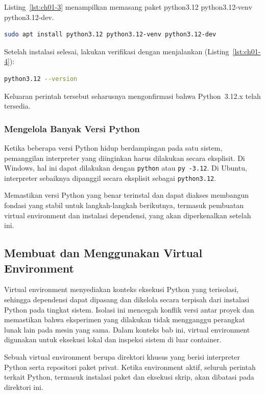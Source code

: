 Listing~\ref{lst:ch01-3} menampilkan memasang paket python3.12 python3.12-venv python3.12-dev.
\begin{lstlisting}[language=bash, caption={Memasang paket python3.12 python3.12-venv python3.12-dev}, label={lst:ch01-3}]
sudo apt install python3.12 python3.12-venv python3.12-dev
\end{lstlisting}

Setelah instalasi selesai, lakukan verifikasi dengan menjalankan (Listing~\ref{lst:ch01-4}):

\begin{lstlisting}[language=bash, caption={Memeriksa versi Python (2)}, label={lst:ch01-4}]
python3.12 --version
\end{lstlisting}

Keluaran perintah tersebut seharusnya mengonfirmasi bahwa Python~3.12.x telah
tersedia.

\subsubsection{Mengelola Banyak Versi Python}

Ketika beberapa versi Python hidup berdampingan pada satu sistem, pemanggilan
interpreter yang diinginkan harus dilakukan secara eksplisit. Di Windows, hal ini
dapat dilakukan dengan \texttt{python} atau \texttt{py -3.12}. Di Ubuntu, interpreter
sebaiknya dipanggil secara eksplisit sebagai \texttt{python3.12}.

Memastikan versi Python yang benar terinstal dan dapat diakses membangun fondasi
yang stabil untuk langkah-langkah berikutnya, termasuk pembuatan virtual
environment dan instalasi dependensi, yang akan diperkenalkan setelah ini.

\subsection{Membuat dan Menggunakan Virtual Environment}

Virtual environment menyediakan konteks eksekusi Python yang terisolasi, sehingga
dependensi dapat dipasang dan dikelola secara terpisah dari instalasi Python pada
tingkat sistem. Isolasi ini mencegah konflik versi antar proyek dan memastikan
bahwa eksperimen yang dilakukan tidak mengganggu perangkat lunak lain pada mesin
yang sama. Dalam konteks bab ini, virtual environment digunakan untuk eksekusi
lokal dan inspeksi sistem di luar container.

Sebuah virtual environment berupa direktori khusus yang berisi interpreter Python
serta repositori paket privat. Ketika environment aktif, seluruh perintah terkait
Python, termasuk instalasi paket dan eksekusi skrip, akan dibatasi pada direktori
ini.

